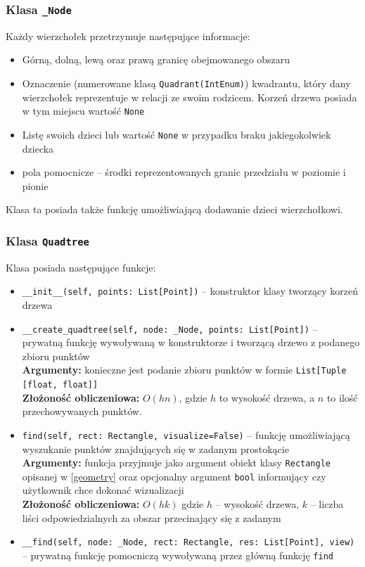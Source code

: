 \documentclass{article}
\begin{document}
\subsubsection{Klasa \texttt{\_Node}}
Każdy wierzchołek przetrzymuje następujące informacje:
\begin{itemize}
    \item Górną, dolną, lewą oraz prawą granicę obejmowanego obszaru
    \item Oznaczenie (numerowane klasą \texttt{Quadrant(IntEnum)}) kwadrantu, który dany wierzchołek reprezentuje w relacji ze swoim rodzicem. Korzeń drzewa posiada w tym miejscu wartość \texttt{None}
    \item Listę swoich dzieci lub wartość \texttt{None} w przypadku braku jakiegokolwiek dziecka
    \item pola pomocnicze -- środki reprezentowanych granic przedziału w poziomie i pionie
\end{itemize}
Klasa ta posiada także funkcję umożliwiającą dodawanie dzieci wierzchołkowi.

\subsubsection{Klasa \texttt{Quadtree}}

Klasa posiada następujące funkcje:
\begin{itemize}
    \item \texttt{\_\_init\_\_(self, points: List[Point])} -- konstruktor klasy tworzący korzeń drzewa
    \item \texttt{\_\_create\_quadtree(self, node: \_Node, points: List[Point])} -- prywatną funkcję wywoływaną w konstruktorze i tworzącą drzewo z podanego zbioru punktów \\
    \textbf{Argumenty:} konieczne jest podanie zbioru punktów w formie \texttt{List[Tuple [float, float]]} \\
    \textbf{Złożoność obliczeniowa:} $O(hn)$, gdzie $h$ to wysokość drzewa, a $n$ to ilość przechowywanych punktów.
    \item \texttt{find(self, rect: Rectangle, visualize=False)} -- funkcję umożliwiającą wyszukanie punktów znajdujących się w zadanym prostokącie \\
    \textbf{Argumenty:} funkcja przyjmuje jako argument obiekt klasy \texttt{Rectangle} opisanej w \ref{geometry} oraz opcjonalny argument \texttt{bool} informujący czy użytkownik chce dokonać wizualizacji \\
    \textbf{Złożoność obliczeniowa:} $O(hk)$ gdzie $h$ -- wysokość drzewa, $k$ -- liczba liści odpowiedzialnych za obszar przecinający się z zadanym
    \item \texttt{\_\_find(self, node: \_Node, rect: Rectangle, res: List[Point], view)} -- prywatną funkcję pomocniczą wywoływaną przez główną funkcję \texttt{find}
\end{itemize}
\end{document}
